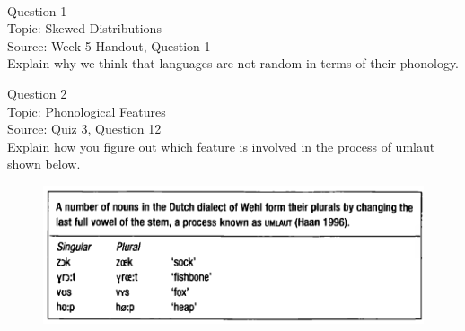 \documentclass[12pt]{article}
\begin{document}
\newpage

\begin{center}
\textbf{{\color{red}{\HUGE END OF EXAM}}}\\

\end{center}
\newpage

\begin{center}
\textbf{{\color{blue}{\HUGE START OF EXAM\\}}}

\textbf{{\color{blue}{\HUGE Student ID: 53176\\}}}

\textbf{{\color{blue}{\HUGE 4:20\\}}}

\end{center}
\newpage

{\large Question 1}\\

Topic: Skewed Distributions\\
Source: Week 5 Handout, Question 1\\

Explain why we think that languages are not random in terms of their phonology.\\


\newpage

{\large Question 2}\\

Topic: Phonological Features\\
Source: Quiz 3, Question 12\\

Explain how you figure out which feature is involved in the process of umlaut shown below.\\

\begin{figure}[H]
\includegraphics{../images/dutch.png}
\end{figure}

\newpage

\begin{center}
\textbf{{\color{red}{\HUGE END OF EXAM}}}\\

\end{center}
\newpage
\end{document}
